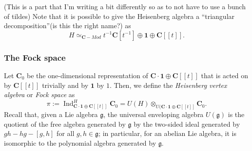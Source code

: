 \documentclass{article}
\newcommand{\CC}{\mathbold{C}}
\newcommand{\one}{\mathbold{1}}
\newcommand{\gf}{\mathfrak{g}}
\DeclareMathOperator{\Ind}{Ind}
\begin{document}
(This is a part that I'm writing a bit differently so as to not have to use a bunch of tildes)
Note that it is possible to give the Heisenberg algebra a ``triangular decomposition''(is this the right name?) as 
\[H \simeq_{\CC-Mod} t^{-1}\CC[t^{-1}] \oplus \one \oplus \CC[[t]].  \]

\subsubsection{The Fock space}
\label{sec:fockspace}

Let $\CC_0$ be the one-dimensional representation of $\CC \cdot\one \oplus \CC[[t]]$ that is acted on by $\CC[[t]]$ trivially and by $\one$ by $1$.  Then, we define the \textit{Heisenberg vertex algebra} or \textit{Fock space} as
\[\pi:=\Ind_{\CC \cdot \one \oplus \CC[[t]]}^H\CC_0=U(H) \otimes_{U(\CC \cdot \one \oplus \CC[[t]]}\CC_0. \]
Recall that, given a Lie algebra $\gf$, the universal enveloping algebra $U(\gf)$ is the quotient of the free algebra generated by $\gf$ by the two-sided ideal generated by $gh-hg-[g,h]$ for all $g,h \in \gf$; in particular, for an abelian Lie algebra, it is isomorphic to the polynomial algebra generated by $\gf$.
\end{document}
